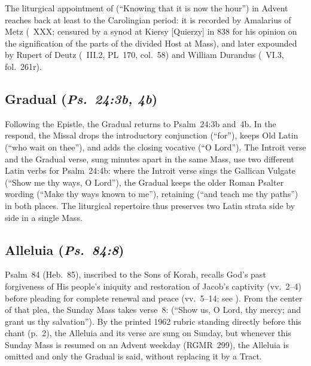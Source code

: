 The liturgical appointment of  (``Knowing that it is now the hour'') in Advent reaches back at least to the Carolingian period: it is recorded by Amalarius of Metz (~XXX; censured by a synod at Kiersy [Quierzy] in 838 for his opinion on the signification of the parts of the divided Host at Mass), and later expounded by Rupert of Deutz (~III.2, PL~170, col.~58) and William Durandus (~VI.3, fol.~261r).

\subsection{Gradual (\textit{Ps.~24:3b, 4b})}

Following the Epistle, the Gradual returns to Psalm~24:3b and~4b. In the respond, the Missal drops the introductory conjunction  (``for''), keeps Old Latin  (``who wait on thee''), and adds the closing vocative  (``O Lord''). The Introit verse and the Gradual verse, sung minutes apart in the same Mass, use two different Latin verbs for Psalm~24:4b: where the Introit verse sings the Gallican Vulgate  (``Show me thy ways, O Lord''), the Gradual keeps the older Roman Psalter wording  (``Make thy ways known to me''), retaining  (``and teach me thy paths'') in both places. The liturgical repertoire thus preserves two Latin strata side by side in a single Mass.

\subsection{Alleluia (\textit{Ps.~84:8})}

Psalm~84 (Heb.~85), inscribed to the Sons of Korah, recalls God's past forgiveness of His people's iniquity and restoration of Jacob's captivity (vv.~2--4) before pleading for complete renewal and peace (vv.~5--14; see \hyperref[sec:date-location]{}). From the center of that plea, the Sunday Mass takes verse~8:  (``Show us, O Lord, thy mercy; and grant us thy salvation''). By the printed 1962 rubric standing directly before this chant (p.~2), the Alleluia and its verse are sung on Sunday, but whenever this Sunday Mass is resumed on an Advent weekday (RGMR~299), the Alleluia is omitted and only the Gradual is said, without replacing it by a Tract.

